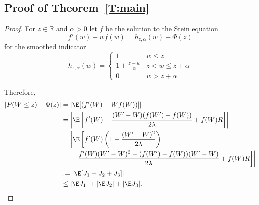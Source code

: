 \subsection{Proof of Theorem~\ref{T:main}}
\begin{proof}
  For $z \in \mathbb{R}$ and $\alpha > 0$ let $f$ be the solution to
  the Stein equation
  \begin{equation}
    f'(w) - wf(w) = h_{z,\alpha}(w) - \Phi(z)
  \end{equation}
  for the smoothed indicator
  \begin{equation}
    h_{z,\alpha}(w) =
    \begin{cases}
      1 & w \leq z \\
      1 + \frac{z-w}{\alpha} & z < w \leq z + \alpha \\
      0 & w > z + \alpha.
    \end{cases}
  \end{equation}

  Therefore,
  \begin{equation}
    \label{eq:triple-bound}
    \begin{split}
      |P(W \leq z) - \Phi(z)| &= |\E [(f'(W)-Wf(W))] | \\
      &= \left | \E \left [
          f'(W) - \frac{(W'-W)(f(W')-f(W))}{2\lambda} +f(W)R
        \right ]\right | \\
      &= \left | \E \left [f'(W)\left (1-\frac{(W'-W)^2}{2\lambda}\right) \right . \right . \\
      &\quad + \left . \left .
          \frac{f'(W)(W'-W)^2-(f(W')-f(W))(W'-W)}{2\lambda} + f(W)R
        \right ] \right | \\
      &:= | \E [J_1 + J_2 + J_3] | \\
      &\leq |\E J_1| + |\E J_2| + |\E J_3|.
    \end{split}
  \end{equation}


\end{proof}
